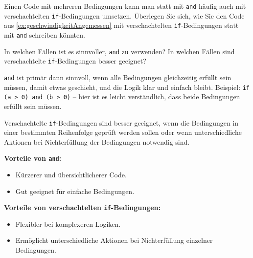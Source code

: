 \begin{mychallenge}
	Einen Code mit mehreren Bedingungen kann man statt mit \lstinline|and| häufig auch mit verschachtelten \lstinline|if|-Bedingungen umsetzen. Überlegen Sie sich, wie Sie den Code aus \cref{ex:geschwindigkeitAngemessen} mit verschachtelten \lstinline|if|-Bedingungen statt mit \lstinline|and| schreiben könnten.

	In welchen Fällen ist es sinnvoller, \lstinline|and| zu verwenden? In welchen Fällen sind verschachtelte \lstinline|if|-Bedingungen besser geeignet?
	\begin{myanswer}
		\lstinline|and| ist primär dann sinnvoll, wenn alle Bedingungen gleichzeitig erfüllt sein müssen, damit etwas geschieht, und die Logik klar und einfach bleibt. Beispiel: \lstinline|if (a > 0) and (b > 0)| -- hier ist es leicht verständlich, dass beide Bedingungen erfüllt sein müssen.

		Verschachtelte \lstinline|if|-Bedingungen sind besser geeignet, wenn die Bedingungen in einer bestimmten Reihenfolge geprüft werden sollen oder wenn unterschiedliche Aktionen bei Nichterfüllung der Bedingungen notwendig sind.

		\textbf{Vorteile von \lstinline|and|:}
		\begin{itemize}
			\item Kürzerer und übersichtlicherer Code.
			\item Gut geeignet für einfache Bedingungen.
		\end{itemize}

		\textbf{Vorteile von verschachtelten \lstinline|if|-Bedingungen:}
		\begin{itemize}
			\item Flexibler bei komplexeren Logiken.
			\item Ermöglicht unterschiedliche Aktionen bei Nichterfüllung einzelner Bedingungen.
		\end{itemize}
	\end{myanswer}
\end{mychallenge}

